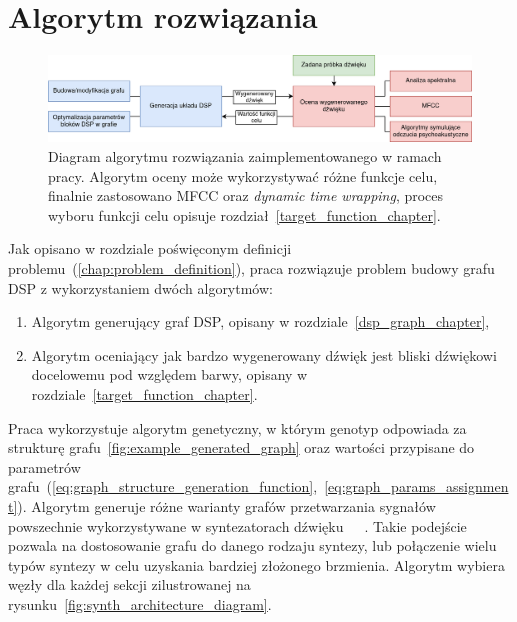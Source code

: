 \chapter{Algorytm rozwiązania}\label{chap:solution_algorithm}

\begin{figure}[H]    
    \centering
    \includegraphics[width=1.0\linewidth]{rys04/solution_algorithm_diagram.png}
    \caption{
      Diagram algorytmu rozwiązania zaimplementowanego w ramach pracy.
      Algorytm oceny może wykorzystywać różne funkcje celu, finalnie zastosowano
      MFCC oraz \textit{dynamic time wrapping},
      proces wyboru funkcji celu opisuje rozdział~\ref{target_function_chapter}.
    }\label{fig:solution_algorithm_diagram}
\end{figure}

Jak opisano w rozdziale poświęconym definicji problemu~(\ref{chap:problem_definition}), praca
rozwiązuje problem budowy grafu DSP z wykorzystaniem dwóch algorytmów:
\begin{enumerate}
  \item Algorytm generujący graf DSP, opisany w rozdziale~\ref{dsp_graph_chapter},
  \item Algorytm oceniający jak bardzo wygenerowany dźwięk jest bliski dźwiękowi docelowemu pod względem barwy,
    opisany w rozdziale~\ref{target_function_chapter}.
\end{enumerate}

Praca wykorzystuje algorytm genetyczny, w którym genotyp odpowiada za
strukturę grafu~\ref{fig:example_generated_graph} oraz wartości
przypisane do parametrów grafu~(\ref{eq:graph_structure_generation_function},~\ref{eq:graph_params_assignment}).
Algorytm generuje różne warianty grafów przetwarzania sygnałów powszechnie
wykorzystywane w syntezatorach dźwięku~\cite{minilogue_diagram}~\cite{digitone_manual}~\cite{yamaha_dx7_manual}.
Takie podejście pozwala na dostosowanie grafu do danego rodzaju syntezy,
lub połączenie wielu typów syntezy w celu uzyskania bardziej złożonego brzmienia.
Algorytm wybiera węzły dla każdej sekcji
zilustrowanej na rysunku~\ref{fig:synth_architecture_diagram}.

